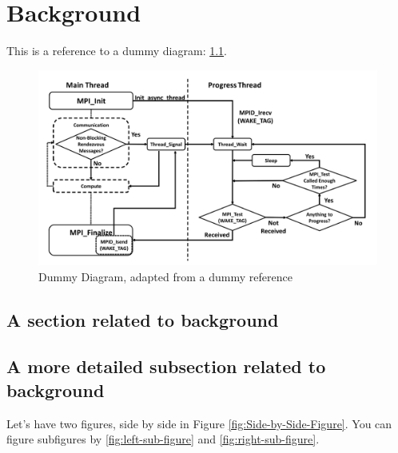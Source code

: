 
\chapter{Background}
\label{ch-background}

\lipsum[1-1]
This is a reference to a dummy diagram: \ref{fig:Dummy-Figure}.

\begin{figure}
	\centering
	\includegraphics[width=0.8\linewidth]{TexFiles/Figures/Dummy-Diagram.png}
	\caption{Dummy Diagram, adapted from a dummy reference \cite{Li2020}}
	\label{fig:Dummy-Figure}
\end{figure}

\section{A section related to background}
\label{sec-bg-programming-models}

\lipsum[2-4]

\section{A more detailed subsection related to background}

\lipsum[5-6]

Let's have two figures, side by side in Figure \ref{fig:Side-by-Side-Figure}.
You can figure subfigures by \ref{fig:left-sub-figure} and \ref{fig:right-sub-figure}.

